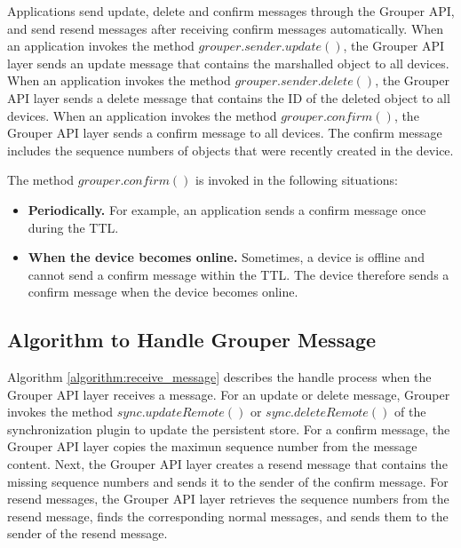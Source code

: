 \documentclass[a4paper,11pt]{report}
\begin{document}
Applications send update, delete and confirm messages through the Grouper API, and send resend messages after receiving confirm messages automatically.
When an application invokes the method $grouper.sender.update()$, the Grouper API layer sends an update message that contains the marshalled object to all devices.
When an application invokes the method $grouper.sender.delete()$, the Grouper API layer sends a delete message that contains the ID of the deleted object to all devices. 
When an application invokes the method $grouper.confirm()$, the Grouper API layer sends a confirm message to all devices. 
The confirm message includes the sequence numbers of objects that were recently created in the device.

The method $grouper.confirm()$ is invoked in the following situations:

\begin{itemize}[leftmargin=7mm]
	\setlength{\itemsep}{1pt}
	\setlength{\parskip}{0pt}
	\setlength{\parsep}{0pt}
	\item \textbf{Periodically.}
	For example, an application sends a confirm message once during the TTL.
	\item \textbf{When the device becomes online.} 
	Sometimes, a device is offline and cannot send a confirm message within the TTL.
	The device therefore sends a confirm message when the device becomes online.
\end{itemize}

\subsection{Algorithm to Handle Grouper Message}

Algorithm \ref{algorithm:receive_message} describes the handle process when the Grouper API layer receives a message.
For an update or delete message, Grouper invokes the method $sync.updateRemote()$ or $sync.deleteRemote()$ of the synchronization plugin to update the persistent store.
For a confirm message, the Grouper API layer copies the maximun sequence number from the message content.
Next, the Grouper API layer creates a resend message that contains the missing sequence numbers and sends it to the sender of the confirm message.
For resend messages, the Grouper API layer retrieves the sequence numbers from the resend message, finds the corresponding normal messages, and sends them to the sender of the resend message.
\end{document}
